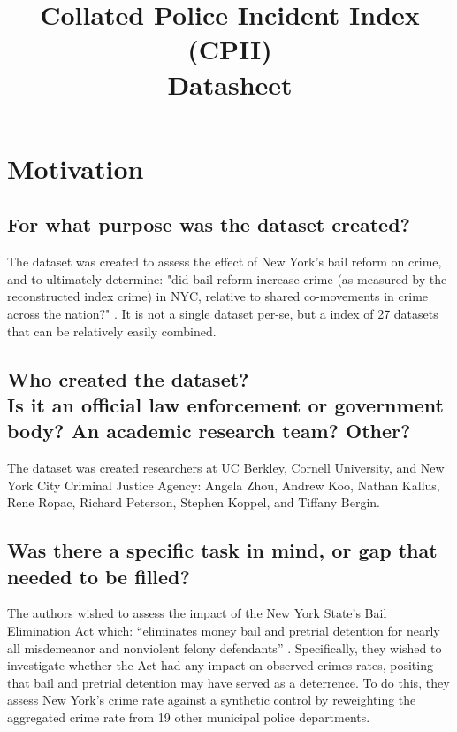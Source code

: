 \documentclass[letterpaper, 10 pt, conference]{ieeeconf}  %
\title{\LARGE \bf
Collated Police Incident Index (CPII)\\{\color{blue}Datasheet}
}
\newcommand{\subtitle}[1]{{\\ \small \normalfont \color{purple} #1}}
\begin{document}
\maketitle
\thispagestyle{empty}
\pagestyle{empty}

\section{Motivation}

\subsection{For what purpose was the dataset created?}

The dataset was created to assess the effect of New York’s bail reform on crime, and to ultimately determine: "did bail reform increase crime (as measured by the reconstructed index crime) in NYC, relative to shared co-movements in crime across the nation?" \cite{zhou2721empirical}. It is not a single dataset per-se, but a index of 27 datasets that can be relatively easily combined.

\subsection{Who created the dataset? \subtitle{Is it an official law enforcement or government body? An academic research team? Other?}}

The dataset was created researchers at UC Berkley, Cornell University, and New York City Criminal Justice Agency: Angela Zhou, Andrew Koo, Nathan Kallus, Rene Ropac, Richard Peterson, Stephen Koppel, and Tiffany Bergin.


\subsection{Was there a specific task in mind, or gap that needed to be filled?}

The authors wished to assess the impact of the New York State’s Bail Elimination Act which: “eliminates money bail and pretrial detention for nearly all misdemeanor and nonviolent felony defendants” \cite{rempel2019bail}. Specifically, they wished to investigate whether the Act had any impact on observed crimes rates, positing that bail and pretrial detention may have served as a deterrence. To do this, they assess New York's crime rate against a synthetic control by reweighting the aggregated crime rate from 19 other municipal police departments.
\end{document}
